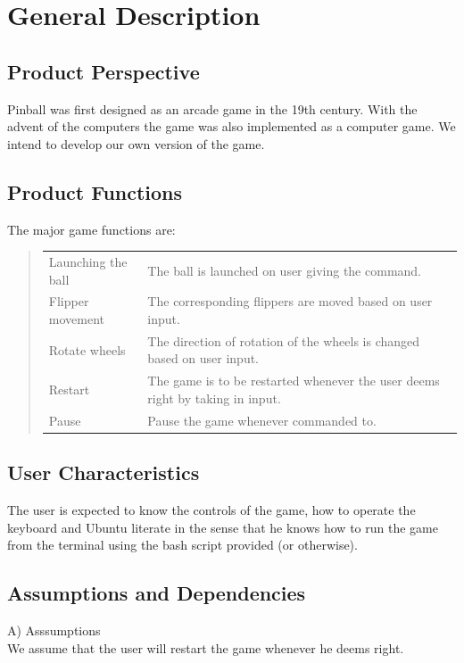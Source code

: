 \documentclass{article}
\begin{document}
    \section{General Description}
    \subsection{Product Perspective}
    Pinball was first designed as an arcade game in the 19th century. With the advent of the computers the game was also implemented as a computer game. We intend to develop our own version of the game.

    \subsection{Product Functions}
    The major game functions are:\\
    \begin{quote}
    \begin{tabular}{ll}
        Launching the ball&The ball is launched on user giving the command.\\
        Flipper movement&The corresponding flippers are moved based on user input.\\
        Rotate wheels&The direction of rotation of the wheels is changed based on user input.\\
        Restart&The game is to be restarted whenever the user deems right by taking in input.\\
        Pause&Pause the game whenever commanded to.
    \end{tabular}
    \end{quote}

    \subsection{User Characteristics}
    The user is expected to know the controls of the game, how to operate the keyboard and Ubuntu literate in the sense that he knows how to run the game from the terminal using the bash script provided (or otherwise).

    \subsection{Assumptions and Dependencies}
    A) Asssumptions\\

    We assume that the user will restart the game whenever he deems right.\\
\end{document}
